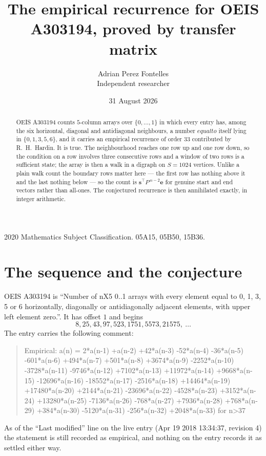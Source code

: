 \documentclass[11pt,a4paper]{article}
\title{The empirical recurrence for OEIS A303194, proved by transfer matrix}
\author{Adrian Perez Fontelles\\ \small Independent researcher}
\date{31 August 2026}
\theoremstyle{plain}
\theoremstyle{definition}
\begin{document}
\maketitle

\begin{abstract}
OEIS A303194 counts $5$-column arrays over $\{0,\dots,1\}$ in which every entry has,
among the six horizontal, diagonal and antidiagonal neighbours, a number $equal to$ itself lying in $\{0,1,3,5,6\}$, and it carries an empirical
recurrence of order $33$ contributed by R.~H.~Hardin. It is true. The neighbourhood
reaches one row up and one row down, so the condition on a row involves three consecutive
rows and a window of two rows is a sufficient state; the array is then a walk in a digraph
on $S=1024$ vertices. Unlike a plain walk count the boundary rows matter here --- the first
row has nothing above it and the last nothing below --- so the count is
$\mathbf{s}^{\!\top}P^{\,n-2}\mathbf{e}$ for genuine start and end vectors rather than
all-ones. The conjectured recurrence is then annihilated exactly, in integer arithmetic.
\end{abstract}

\noindent\small 2020 Mathematics Subject Classification. 05A15, 05B50, 15B36.\normalsize

\section{The sequence and the conjecture}

OEIS A303194 is ``Number of nX5 0..1 arrays with every element equal to 0, 1, 3, 5 or 6 horizontally, diagonally or antidiagonally adjacent elements, with upper left element zero.''. It has offset
$1$ and begins
\[
8, 25, 43, 97, 523, 1751, 5573, 21575,\ \dots
\]
The entry carries the following comment:
\begin{quote}\small
Empirical: a(n) = 2*a(n-1) +a(n-2) +42*a(n-3) -52*a(n-4) -36*a(n-5) -601*a(n-6) +494*a(n-7) +501*a(n-8) +3674*a(n-9) -2252*a(n-10) -3728*a(n-11) -9746*a(n-12) +7102*a(n-13) +11972*a(n-14) +9668*a(n-15) -12696*a(n-16) -18552*a(n-17) -2516*a(n-18) +14464*a(n-19) +17480*a(n-20) +2144*a(n-21) -23696*a(n-22) -4528*a(n-23) +3152*a(n-24) +13280*a(n-25) -7136*a(n-26) -768*a(n-27) +7936*a(n-28) +768*a(n-29) +384*a(n-30) -5120*a(n-31) -256*a(n-32) +2048*a(n-33) for n>37
\end{quote}
As of the ``Last modified'' line on the live entry (Apr 19 2018 13:34:37, revision
4) the statement is still recorded as empirical, and nothing on the entry
records it as settled either way.
\end{document}
